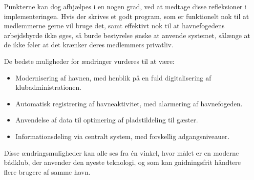 Punkterne kan dog afhjælpes i en nogen grad, ved at medtage disse refleksioner i implementeringen. Hvis der skrives et godt program, som er funktionelt nok til at medlemmerne gerne vil bruge det, samt effektivt nok til at havnefogedens arbejdsbyrde ikke øges, så burde bestyrelse ønske at anvende systemet, sålænge at de ikke føler at det krænker deres medlemmers privatliv.

De bedste muligheder for ændringer vurderes til at være:

\begin{itemize}
  \item Modernisering af havnen, med henblik på en fuld digitalisering af klubadministrationen.
  \item Automatisk registrering af havneaktivitet, med alarmering af havnefogeden.
  \item Anvendelse af data til optimering af pladstildeling til gæster.
  \item Informationsdeling via centralt system, med forskellig adgangsniveauer.
\end{itemize}

Disse ændringsmuligheder kan alle ses fra én vinkel, hvor målet er en moderne bådklub, der anvender den nyeste teknologi, og som kan gnidningsfrit håndtere flere brugere af samme havn.
